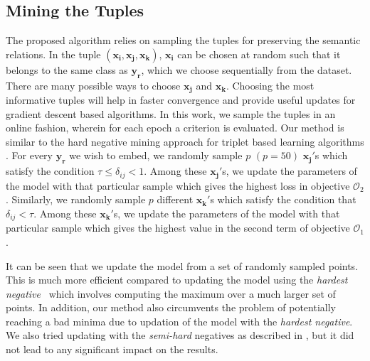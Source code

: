 \documentclass[10pt,twocolumn,letterpaper]{article}
\begin{document}
\subsection{Mining the Tuples}
\label{mining}
The proposed algorithm relies on sampling the tuples for preserving the semantic relations. 
In the tuple $(\mathbf{x_i},\mathbf{x_j},\mathbf{x_k})$, $\mathbf{x_i}$ can be chosen at random such that it belongs to the same class as $\mathbf{y_r}$, which we choose sequentially from the dataset.
There are many possible ways to choose $\mathbf{x_j}$ and $\mathbf{x_k}$. 
Choosing the most informative tuples will help in faster convergence and provide useful updates for gradient descent based algorithms. 
In this work, we sample the tuples in an online fashion, wherein for each epoch a criterion is evaluated. Our method is similar to the hard negative mining approach for triplet based learning algorithms \cite{bucher2016hard,schroff2015facenet,simo2015discriminative}.
For every $\mathbf{y_r}$ we wish to embed, we randomly sample $p$ $(p = 50)$ $\mathbf{x_j}'$s which satisfy the condition $\tau\leq\delta_{ij}<1$. Among these $\mathbf{x_j}'$s, we update the parameters of the model with that particular sample which gives the highest loss in objective $\mathcal{O}_2$.
Similarly, we randomly sample $p$ different $\mathbf{x_k}'$s which satisfy the condition that $\delta_{ij}<\tau$. Among these $\mathbf{x_k}'$s, we update the parameters of the model with that particular sample which gives the highest value in the second term of objective $\mathcal{O}_1$. 

It can be seen that we update the model from a set of randomly sampled points. 
This is much more efficient compared to updating the model using the \textit{hardest negative}~\cite{schroff2015facenet} which involves computing the maximum over a much larger set of points. In addition, our method also circumvents the problem of potentially reaching a bad minima due to updation of the model with the \textit{hardest negative}. We also tried updating with the \textit{semi-hard} negatives as described in \cite{schroff2015facenet}, but it did not lead to any significant impact on the results. 
\end{document}
